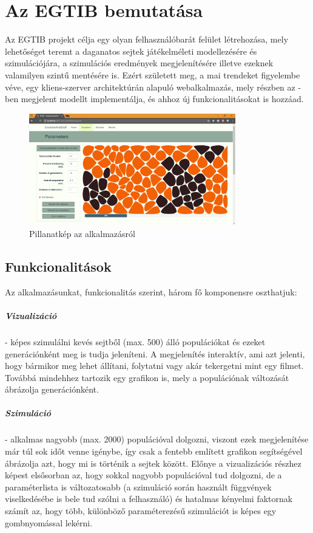 \newcommand{\projectName}{Az EGTIB}

\chapter{\projectName{} bemutatása}

\projectName{} projekt célja egy olyan felhasználóbarát felület létrehozása, mely lehetőséget teremt a daganatos sejtek játékelméleti modellezésére és szimulációjára, a szimulációs eredmények megjelenítésére illetve ezeknek valamilyen szintű mentésére is. Ezért született meg, a mai trendeket figyelembe véve, egy kliens-szerver architektúrán alapuló webalkalmazás, mely részben az \cite{archetti2016cooperation}-ben megjelent modellt implementálja, és ahhoz új funkcionalitásokat is hozzáad.

\begin{figure}[ht!]
	\centering
	\includegraphics[width=90mm]{images/EGTIB}
	\caption{Pillanatkép az alkalmazásról \label{fig:SimulateWithDiagram}}
\end{figure}

\section{Funkcionalitások}

Az alkalmazásunkat, funkcionalitás szerint, három fő komponensre oszthatjuk:

\paragraph{Vizualizáció}- képes szimulálni kevés sejtből (max. 500) álló populációkat és ezeket generációnként meg is tudja jeleníteni. A megjelenítés interaktív, ami azt jelenti, hogy bármikor meg lehet állítani, folytatni vagy akár tekergetni mint egy filmet. Továbbá mindehhez tartozik egy grafikon is, mely a populációnak változását ábrázolja generációnként.

\paragraph{Szimuláció}- alkalmas nagyobb (max. 2000) populációval dolgozni, viszont ezek megjelenítése már túl sok időt venne igénybe, így csak a fentebb említett grafikon segítségével ábrázolja azt, hogy mi is történik a sejtek között. Előnye a vizualizációs részhez képest elsősorban az, hogy sokkal nagyobb populációval tud dolgozni, de a paraméterlista is változatosabb (a szimuláció során használt függvények viselkedésébe is bele tud szólni a felhasználó) és hatalmas kényelmi faktornak számít az, hogy több, különböző paraméterezésű szimulációt is képes egy gombnyomással lekérni.

